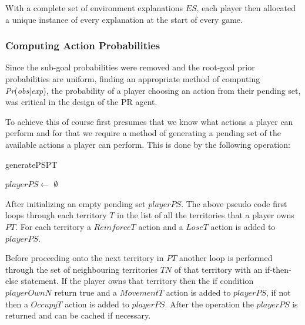 \documentclass[parskip]{cs4rep}
\begin{document}
With a complete set of environment explanations $ES$, each player then allocated a unique instance of every explanation at the start of every game. 

\subsubsection{Computing Action Probabilities}

Since the sub-goal probabilities were removed and the root-goal prior probabilities are uniform, finding an appropriate method of computing \textit{Pr}(\textit{obs}|\textit{exp}), the probability of a player choosing an action from their pending set, was critical in the design of the PR agent. 

To achieve this of course first presumes that we know what actions a player can perform and for that we require a method of generating a pending set of the available actions a player can perform. This is done by the following operation:

\begin{pseudocode}[ruled]{generatePS}{PT}
\begin{algorithm}[H]

$playerPS \gets $ $\emptyset$

\end{algorithm}
\end{pseudocode}

After initializing an empty pending set $playerPS$. The above pseudo code first loops through each territory $T$ in the list of all the territories that a player owns $PT$. For each territory a $ReinforceT$ action and a $LoseT$ action is added to $playerPS$. 

Before proceeding onto the next territory in $PT$ another loop is performed through the set of neighbouring territories $TN$ of that territory with an if-then-else statement. If the player owns that territory then the if condition $playerOwnN$ return true and a $MovementT$ action is added to $playerPS$, if not then a $OccupyT$ action is added to $playerPS$. After the operation the $playerPS$ is returned and can be cached if necessary.
\end{document}
